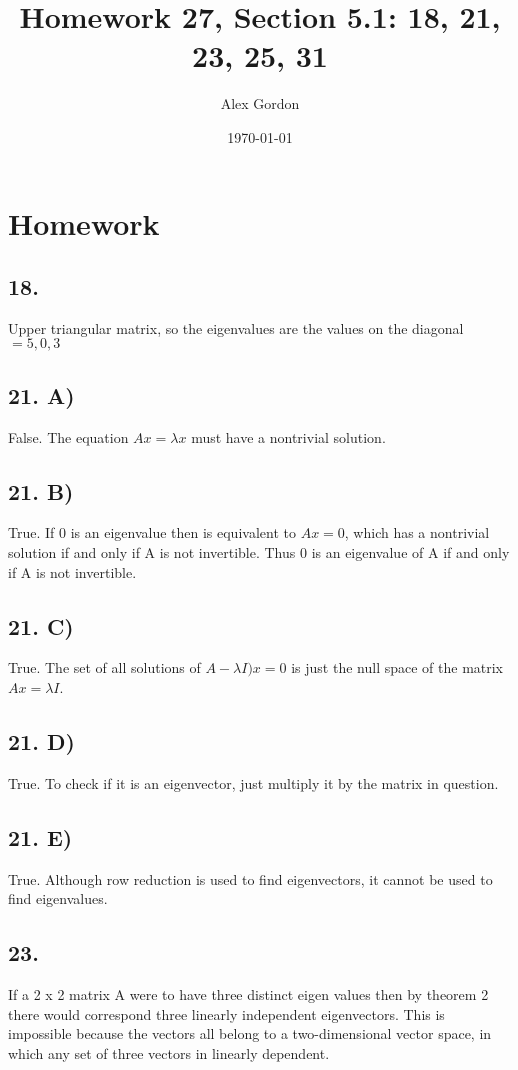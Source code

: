 \documentclass[12]{scrartcl}
\begin{document}
\title{Homework 27, Section 5.1: 18, 21, 23, 25, 31}
\author{Alex Gordon}
\date{\today}
\maketitle
\section*{Homework}
\subsection*{18.}
Upper triangular matrix, so the eigenvalues are the values on the diagonal $= 5, 0, 3$
\subsection*{21. A)}
False. The equation $Ax = \lambda x$ must have a nontrivial solution. 
\subsection*{21. B)}
True. If 0 is an eigenvalue then is equivalent to $Ax = 0$, which has a nontrivial solution if and only if A is not invertible. Thus 0 is an eigenvalue of A if and only if A is not invertible. 
\subsection*{21. C)}
True. The set of all solutions of $A - \lambda I)x = 0$ is just the null space of the matrix $Ax = \lambda I$. 
\subsection*{21. D)}
True. To check if it is an eigenvector, just multiply it by the matrix in question. 
\subsection*{21. E)}
True. Although row reduction is used to find eigenvectors, it cannot be used to find eigenvalues. 
\subsection*{23.}
If a 2 x 2 matrix A were to have three distinct eigen values then by theorem 2 there would correspond three linearly independent eigenvectors. This is impossible because the vectors all belong to a two-dimensional vector space, in which any set of three vectors in linearly dependent. 
\end{document}
